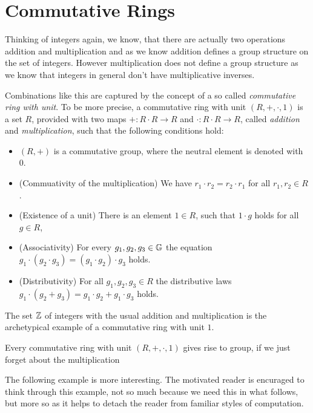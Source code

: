 \section{Commutative Rings}
Thinking of integers again, we know, that there are actually two operations addition and multiplication and as we know addition defines a group structure on the set of integers. However multiplication does not define a group structure as we know that integers in general don't have multiplicative inverses. 

Combinations like this are captured by the concept of a so called \textit{commutative ring with unit}. To be more precise, a commutative ring with unit $ (R, +, \cdot, 1) $ is a set $R$, provided with two maps $ +: R \cdot R \to R $ and $ \cdot: R \cdot R \to R $, called \textit{addition} and \textit{multiplication}, such that the following conditions hold:
\begin{itemize}
\item $ \left (R, + \right) $ is a commutative group, where the neutral element is denoted  with $ 0 $.
\item (Commuativity of the multiplication) We have $r_1\cdot r_2 = r_2\cdot r_1$ for all $r_1, r_2\in R$. 
\item (Existence of a unit) There is an element $1\in R$, such that $1\cdot g$ holds for all $g\in R$, 
\item (Associativity) For every $g_1,g_2,g_3\in\mathbb{G}$ the equation 
$g_1\cdot(g_2\cdot g_3) = (g_1\cdot g_2)\cdot g_3$ holds. 
\item (Distributivity) For all $ g_1, g_2, g_3 \in R $ the distributive laws
$ g_1 \cdot \left (g_2 + g_3 \right) = g_1 \cdot g_2 + g_1 \cdot g_3$ holds.
\end{itemize}
\begin{example} The set $\mathbb{Z}$ of integers with the usual addition and multiplication is the archetypical example of a commutative ring with unit $1$. 
\end{example}
\begin{example} Every commutative ring with unit $(R,+,\cdot,1)$ gives rise to group, if we just forget about the multiplication
\end{example}
The following example is more interesting. The motivated reader is encuraged to think through this example, not so much because we need this in what follows, but more so as it helps to detach the reader from familiar styles of computation. 
